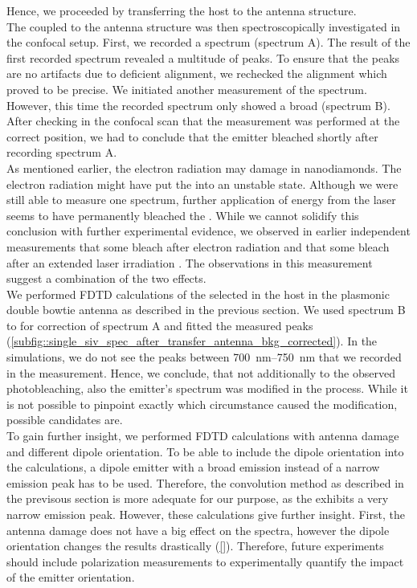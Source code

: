 			Hence, we proceeded by transferring the host \nd to the antenna structure.
			\\
			The \siv coupled to the antenna structure was then spectroscopically investigated in the confocal setup.
			First, we recorded a spectrum (spectrum A).
			The result of the first recorded spectrum revealed a multitude of peaks.
			To ensure that the peaks are no artifacts due to deficient alignment, we rechecked the alignment which proved to be precise.
			We initiated another measurement of the spectrum.
			However, this time the recorded spectrum only showed a broad \bkg (spectrum B).
			After checking in the confocal scan that the measurement was performed at the correct position, we had to conclude that the emitter bleached shortly after recording spectrum A.
			\\
			As mentioned earlier, the electron radiation may damage \sivs in nanodiamonds.
			The electron radiation might have put the \siv into an unstable state.
			Although we were still able to measure one spectrum, further application of energy from the laser seems to have permanently bleached the \siv.
			While we cannot solidify this conclusion with further experimental evidence, we observed in earlier independent measurements that some \sivs bleach after electron radiation and that some \sivs bleach after an extended laser irradiation \cite{}.
			The observations in this measurement suggest a combination of the two effects.
			\\
			We performed FDTD calculations of the selected \siv in the host \nd in the plasmonic double bowtie antenna as described in the previous section.
			We used spectrum B to for \bkg correction of spectrum A and fitted the measured peaks (\autoref{subfig::single_siv_spec_after_transfer_antenna_bkg_corrected}).
			In the simulations, we do not see the peaks between \SIrange{700}{750}{nm} that we recorded in the measurement.
			Hence, we conclude, that not additionally to the observed photobleaching, also the emitter's spectrum was modified in the \pp process.
			While it is not possible to pinpoint exactly which circumstance caused the modification, possible candidates are.
			\\
			To gain further insight, we performed FDTD calculations with antenna damage and different dipole orientation.
			To be able to include the dipole orientation into the calculations, a dipole emitter with a broad emission instead of a narrow emission peak has to be used.
			Therefore, the convolution method as described in the previsous section is more adequate for our purpose, as the \siv exhibits a very narrow emission peak.
			However, these calculations give further insight.
			First, the antenna damage does not have a big effect on the spectra, however the dipole orientation changes the results drastically (\autoref{}).
			Therefore, future experiments should include polarization measurements to experimentally quantify the impact of the emitter orientation.


